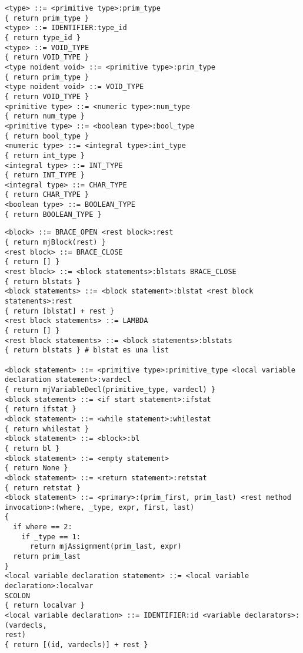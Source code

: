 \documentclass [a4paper,abstracton,titlepage]{scrartcl}
\begin{document}
    \begin{lstlisting}
<type> ::= <primitive type>:prim_type
{ return prim_type }
<type> ::= IDENTIFIER:type_id
{ return type_id }
<type> ::= VOID_TYPE
{ return VOID_TYPE }
<type noident void> ::= <primitive type>:prim_type
{ return prim_type }
<type noident void> ::= VOID_TYPE
{ return VOID_TYPE }
<primitive type> ::= <numeric type>:num_type
{ return num_type }
<primitive type> ::= <boolean type>:bool_type
{ return bool_type }
<numeric type> ::= <integral type>:int_type
{ return int_type }
<integral type> ::= INT_TYPE
{ return INT_TYPE }
<integral type> ::= CHAR_TYPE
{ return CHAR_TYPE }
<boolean type> ::= BOOLEAN_TYPE
{ return BOOLEAN_TYPE }
    \end{lstlisting}

    \begin{lstlisting}
<block> ::= BRACE_OPEN <rest block>:rest
{ return mjBlock(rest) }
<rest block> ::= BRACE_CLOSE
{ return [] }
<rest block> ::= <block statements>:blstats BRACE_CLOSE
{ return blstats }
<block statements> ::= <block statement>:blstat <rest block statements>:rest
{ return [blstat] + rest }
<rest block statements> ::= LAMBDA
{ return [] }
<rest block statements> ::= <block statements>:blstats
{ return blstats } # blstat es una list

<block statement> ::= <primitive type>:primitive_type <local variable
declaration statement>:vardecl
{ return mjVariableDecl(primitive_type, vardecl) }
<block statement> ::= <if start statement>:ifstat
{ return ifstat }
<block statement> ::= <while statement>:whilestat
{ return whilestat }
<block statement> ::= <block>:bl
{ return bl }
<block statement> ::= <empty statement>
{ return None }
<block statement> ::= <return statement>:retstat
{ return retstat }
<block statement> ::= <primary>:(prim_first, prim_last) <rest method
invocation>:(where, _type, expr, first, last)
{
  if where == 2:
    if _type == 1:
      return mjAssignment(prim_last, expr)
  return prim_last
}
<local variable declaration statement> ::= <local variable declaration>:localvar
SCOLON
{ return localvar }
<local variable declaration> ::= IDENTIFIER:id <variable declarators>:(vardecls,
rest)
{ return [(id, vardecls)] + rest }


\end{lstlisting}
\end{document}
